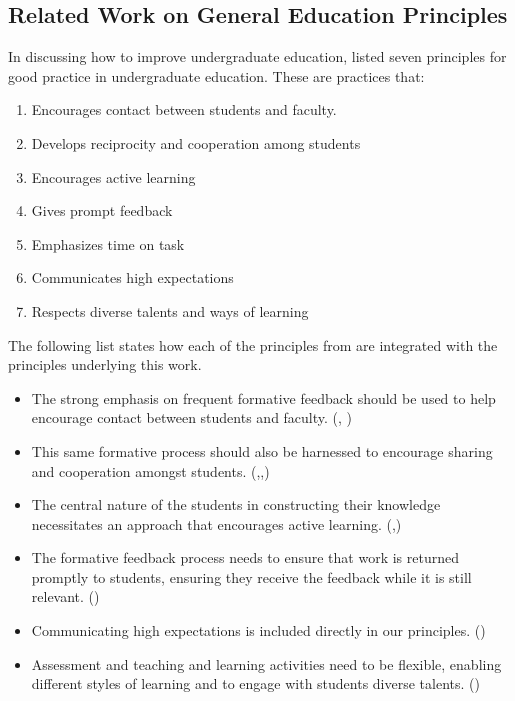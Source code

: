 

\subsection{Related Work on General Education Principles} %
\label{ssub:related_work_on_education_principles}

%
%
%
%


In discussing how to improve undergraduate education, \citet{Chickering:1987} listed seven principles for good practice in undergraduate education. These are practices that:
\begin{enumerate}
	\item Encourages contact between students and faculty.
	\item Develops reciprocity and cooperation among students
	\item Encourages active learning
	\item Gives prompt feedback
	\item Emphasizes time on task
	\item Communicates high expectations
	\item Respects diverse talents and ways of learning
\end{enumerate}

The following list states how each of the principles from \citet{Chickering:1987} are integrated with the principles underlying this work. 
\begin{itemize}[noitemsep,nolistsep]
	\item The strong emphasis on frequent formative feedback should be used to help encourage contact between students and faculty. (, )
	\item This same formative process should also be harnessed to encourage sharing and cooperation amongst students. (,,)
	\item The central nature of the students in constructing their knowledge necessitates an approach that encourages active learning. (,)
	\item The formative feedback process needs to ensure that work is returned promptly to students, ensuring they receive the feedback while it is still relevant. ()
	\item Communicating high expectations is included directly in our principles. ()
	\item Assessment and teaching and learning activities need to be flexible, enabling different styles of learning and to engage with students diverse talents. ()
\end{itemize}

